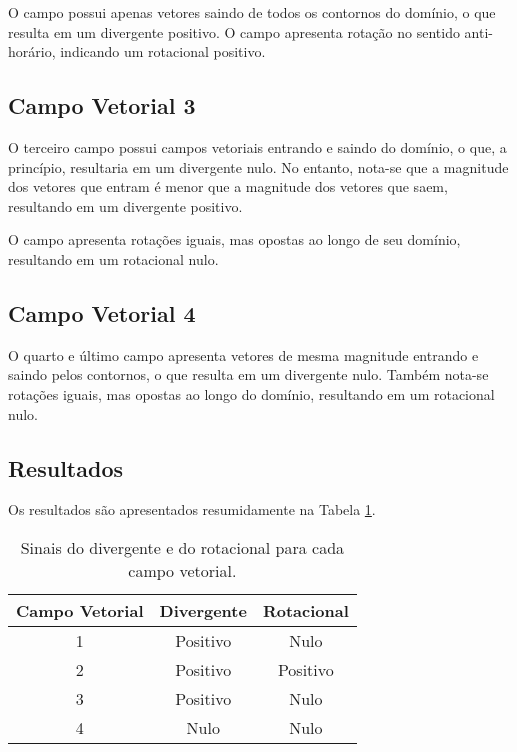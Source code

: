 O campo possui apenas vetores saindo  de todos os contornos do dom\'inio, o que resulta em um divergente positivo. O campo apresenta rota\c{c}\~ao no sentido anti-hor\'ario, indicando um rotacional positivo.

\subsection{Campo Vetorial 3} \label{sec:campo3}
O terceiro campo possui campos vetoriais entrando e saindo do dom\'inio, o que, a princ\'ipio, resultaria em um divergente nulo. No entanto, nota-se que a magnitude dos vetores que entram \'e menor que a magnitude dos vetores que saem, resultando em um divergente positivo. 

O campo apresenta rota\c{c}\~oes iguais, mas opostas ao longo de seu dom\'inio, resultando em um rotacional nulo.

\subsection{Campo Vetorial 4} \label{sec:campo4}
O quarto e \'ultimo campo apresenta vetores de mesma magnitude entrando e saindo pelos contornos, o que resulta em um divergente nulo. Tamb\'em nota-se rota\c{c}\~oes iguais, mas opostas ao longo do dom\'inio, resultando em um rotacional nulo.

\subsection{Resultados} \label{sec:res5}
Os resultados s\~ao apresentados resumidamente na Tabela \ref{tab:divrot}.
\begin{table}[h]
    \centering
    \caption{Sinais do divergente e do rotacional para cada campo vetorial.}
    \vskip 0.2cm
    \begin{tabular}{ccc}
        \hline
        \textbf{Campo Vetorial} & \textbf{Divergente} & \textbf{Rotacional} \\
        \hline
        1 & Positivo & Nulo \\
        2 & Positivo & Positivo \\
        3 & Positivo & Nulo \\
        4 & Nulo & Nulo \\
        \hline
    \end{tabular}
    \label{tab:divrot}
\end{table}